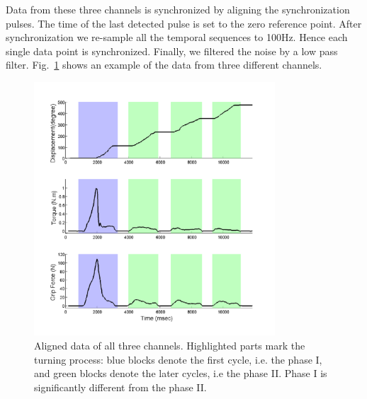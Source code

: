 
Data from these three channels is synchronized by aligning the synchronization pulses. The time of the last detected pulse is set to the zero reference point. After synchronization we re-sample all the temporal sequences to 100Hz. Hence each single data point is synchronized. Finally, we filtered the noise by a low pass filter. Fig.~\ref{fig:3channels} shows an example of the data from three different channels.




\begin{figure}
  \centering
  \hspace{-1cm}
  \includegraphics[width=9cm]{./fig/b3c2_1_sTF.pdf}
  \vspace{-0.5cm}
  \caption{ \scriptsize{Aligned data of all three channels. Highlighted parts mark the turning process: blue blocks denote the first cycle, i.e. the phase I, and green blocks denote the later cycles, i.e the phase II. Phase I is significantly different from the phase II.}
}
\label{fig:3channels}
\end{figure}

